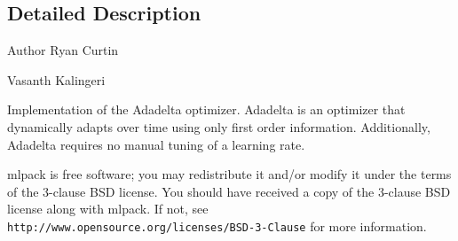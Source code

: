 \subsection{Detailed Description}
\begin{DoxyAuthor}{Author}
Ryan Curtin 

Vasanth Kalingeri
\end{DoxyAuthor}
Implementation of the Adadelta optimizer. Adadelta is an optimizer that dynamically adapts over time using only first order information. Additionally, Adadelta requires no manual tuning of a learning rate.

mlpack is free software; you may redistribute it and/or modify it under the terms of the 3-\/clause B\+SD license. You should have received a copy of the 3-\/clause B\+SD license along with mlpack. If not, see {\tt http\+://www.\+opensource.\+org/licenses/\+B\+S\+D-\/3-\/\+Clause} for more information. 